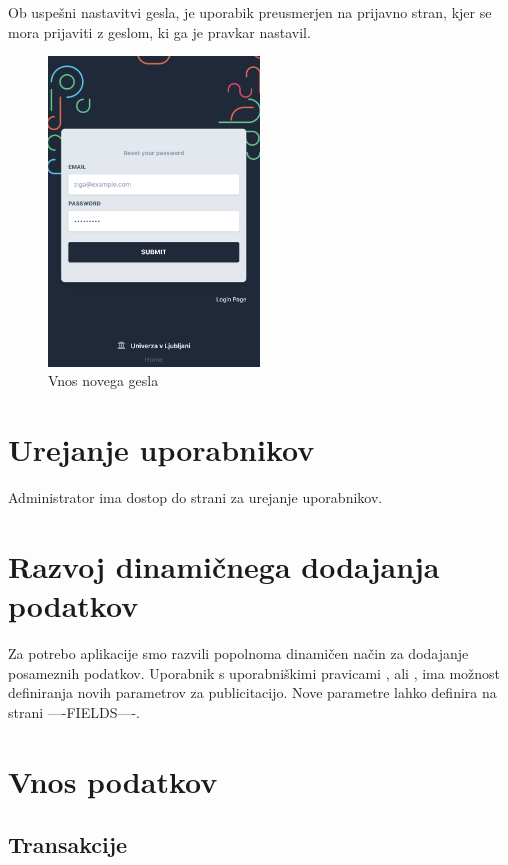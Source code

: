 \documentclass[a4paper, 12pt]{book}
\begin{document}
Ob uspešni nastavitvi gesla, je uporabik preusmerjen na prijavno stran, kjer se mora prijaviti z geslom, ki ga je pravkar nastavil.

\begin{figure}[h]
\begin{center}
\includegraphics[width=0.5\textwidth]{slike/reset_password.png}
\end{center}
\caption{ Vnos novega gesla }
\label{password-reset-form}
\end{figure}

\section{Urejanje uporabnikov}
\label{administracija-uporabnikov}
Administrator ima dostop do strani za urejanje uporabnikov. 

\section{Razvoj dinamičnega dodajanja podatkov}
Za potrebo aplikacije smo razvili popolnoma dinamičen način za dodajanje posameznih podatkov. Uporabnik s uporabniškimi pravicami , ali , ima možnost definiranja novih parametrov za publicitacijo. Nove parametre lahko definira na strani ----FIELDS----. 

\section{Vnos podatkov}

\subsection{Transakcije}
\end{document}
